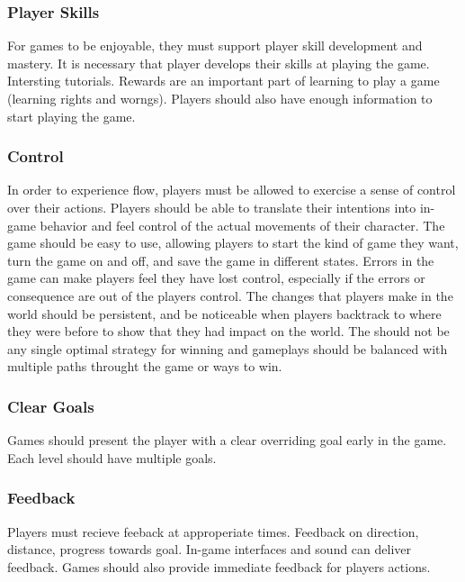     \subsubsection*{Player Skills}
    For games to be enjoyable, they must support player skill development and mastery. It is necessary that player develops their skills at playing the game. Intersting tutorials. Rewards are an important part of learning to play a game (learning rights and worngs). Players should also have enough information to start playing the game. 

    \subsubsection*{Control}
    In order to experience flow, players must be allowed to exercise a sense of control over their actions. Players should be able to translate their intentions into in-game behavior and feel control of the actual movements of their character. 
    The game should be easy to use, allowing players to start the kind of game they want, turn the game on and off, and save the game in different states. 
    Errors in the game can make players feel they have lost control, especially if the errors or consequence are out of the players control. 
    The changes that players make in the world should be persistent, and be noticeable when players backtrack to where they were before to show that they had impact on the world. 
    The should not be any single optimal strategy for winning and gameplays should be balanced with multiple paths throught the game or ways to win. 

    \subsubsection*{Clear Goals}
    Games should present the player with a clear overriding goal early in the game. Each level should have multiple goals. 

    \subsubsection*{Feedback}
    Players must recieve feeback at approperiate times. Feedback on direction, distance, progress towards goal. In-game interfaces and sound can deliver feedback. Games should also provide immediate feedback for players actions. 

